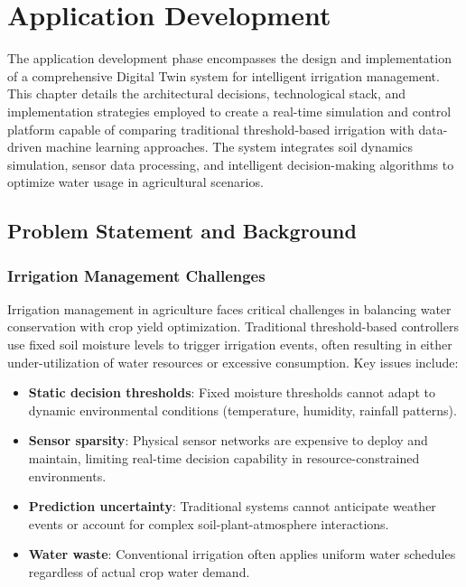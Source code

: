 \chapter{Application Development}
\label{chap:ch3}

\par The application development phase encompasses the design and implementation of a comprehensive Digital Twin system for intelligent irrigation management. This chapter details the architectural decisions, technological stack, and implementation strategies employed to create a real-time simulation and control platform capable of comparing traditional threshold-based irrigation with data-driven machine learning approaches. The system integrates soil dynamics simulation, sensor data processing, and intelligent decision-making algorithms to optimize water usage in agricultural scenarios.


\section{Problem Statement and Background}
\label{sec:ch3sec1}

\subsection{Irrigation Management Challenges}

Irrigation management in agriculture faces critical challenges in balancing water conservation with crop yield optimization. Traditional threshold-based controllers use fixed soil moisture levels to trigger irrigation events, often resulting in either under-utilization of water resources or excessive consumption. Key issues include:

\begin{itemize}
    \item \textbf{Static decision thresholds}: Fixed moisture thresholds cannot adapt to dynamic environmental conditions (temperature, humidity, rainfall patterns).
    \item \textbf{Sensor sparsity}: Physical sensor networks are expensive to deploy and maintain, limiting real-time decision capability in resource-constrained environments.
    \item \textbf{Prediction uncertainty}: Traditional systems cannot anticipate weather events or account for complex soil-plant-atmosphere interactions.
    \item \textbf{Water waste}: Conventional irrigation often applies uniform water schedules regardless of actual crop water demand.
\end{itemize}

